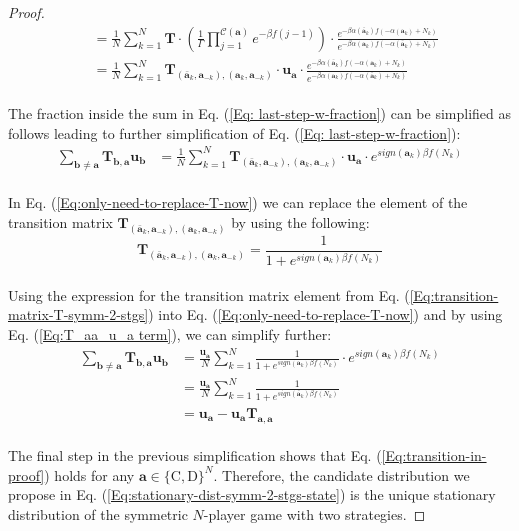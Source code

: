 \documentclass[11pt]{article}
\theoremstyle{plainCl1}
\theoremstyle{plainCl2}
\newcommand{\abf}{\mathbf{a}}
\newcommand{\bbf}{\mathbf{b}}
\newcommand{\T}{\mathbf{T}}
\newcommand{\ubf}{\mathbf{u}}
\newcommand{\C}{\mathrm{C}}
\newcommand{\D}{\mathrm{D}}
\begin{document}
\begin{proof}
\begin{align}
&= \frac{1}{N} \sum_{k=1}^N  \T \cdot \left( \frac{1}{\Gamma} \prod_{j=1}^{\mathcal{C}(\abf)} e^{-\beta f(j-1)}\right) \cdot \frac{e^{-\beta \alpha(\bar{\abf}_k)f(-\alpha(\abf_k)+ N_k)}}{e^{-\beta \alpha(\abf_k)f(-\alpha(\bar{\abf}_k) +N_k)}} \\[10pt]
&= \frac{1}{N} \sum_{k=1}^N  \T_{(\bar{\abf}_k, \abf_{-k}),(\abf_k, \abf_{-k})} \cdot \ubf_\abf \cdot \frac{e^{-\beta \alpha(\bar{\abf}_k)f(-\alpha(\abf_k)+ N_k)}}{e^{-\beta \alpha(\abf_k)f(-\alpha(\bar{\abf}_k) +N_k)}} \label{Eq: last-step-w-fraction} 
\end{align}
\\ \noindent The fraction inside the sum in  Eq. (\ref{Eq: last-step-w-fraction}) can be simplified as follows leading to further simplification of Eq. (\ref{Eq: last-step-w-fraction}):
\begin{align}
\sum_{\bbf \neq \abf} \T_{\bbf, \abf} \ubf_{\bbf} &= \frac{1}{N} \sum_{k=1}^N  \T_{(\bar{\abf}_k, \abf_{-k}),(\abf_k, \abf_{-k})} \cdot \ubf_\abf \cdot e^{sign(\abf_k) \beta f(N_k)} 
\label{Eq:only-need-to-replace-T-now}
\end{align}
\\ \noindent In Eq. (\ref{Eq:only-need-to-replace-T-now}) we can replace the element of the transition matrix $\T_{(\bar{\abf}_k, \abf_{-k}),(\abf_k, \abf_{-k})}$ by using the following: 
\begin{equation}
\T_{(\bar{\abf}_k, \abf_{-k}),(\abf_k, \abf_{-k})} = \frac{1}{1 + \displaystyle e^{\mathit{sign}(\abf_k) \beta f(N_k)}} 
\label{Eq:transition-matrix-T-symm-2-stgs}
\end{equation}
\\ \noindent Using the expression for the transition matrix element from Eq. (\ref{Eq:transition-matrix-T-symm-2-stgs}) into Eq. (\ref{Eq:only-need-to-replace-T-now}) and by using Eq. (\ref{Eq:T_aa_u_a term}), we can simplify further: 
\begin{align}
\sum_{\bbf \neq \abf} \T_{\bbf, \abf} \ubf_{\bbf} &= \frac{\ubf_\abf}{N} \sum_{k=1}^N \frac{1}{1 + \displaystyle e^{\mathit{sign}(\abf_k) \beta f(N_k)}} \cdot  e^{sign(\abf_k) \beta f(N_k)} \\[10pt]
&= \frac{\ubf_\abf}{N} \sum_{k=1}^N \frac{1}{1 + \displaystyle e^{\mathit{sign}(\bar{\abf}_k) \beta f(N_k)}}  \\[10pt]
&= \ubf_\abf - \ubf_\abf \T_{\abf,\abf}
\end{align}
\\ \noindent The final step in the previous simplification shows that Eq. (\ref{Eq:transition-in-proof}) holds for any $\abf \in \{\C,\D\}^N$. Therefore, the candidate distribution we propose in Eq. (\ref{Eq:stationary-dist-symm-2-stgs-state}) is the unique stationary distribution of the symmetric $N$-player game with two strategies. 
\end{proof}
\end{document}
